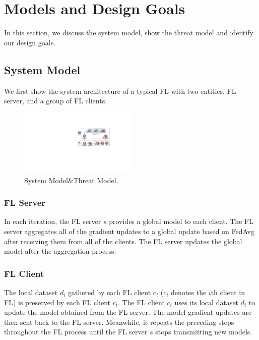 \documentclass[journal]{IEEEtran}
\begin{document}
\section{Models and Design Goals}

In this section, we discuss the system model, show the threat model and identify our design goals.

\subsection{System Model}We first show the system architecture of a typical FL with two entities, FL server, and a group of FL clients.
  \begin{figure}
    \centering
  \includegraphics[width=0.5\textwidth]{figures/Figure_System.pdf}
  \caption{System Model\&Threat Model.}
  \label{fig_system}
  \end{figure}   
\subsubsection{{FL Server}} In each iteration, the FL server $s$ provides a global model to each client. The FL server aggregates all of the gradient updates to a global update based on FedAvg after receiving them from all of the clients. The FL server updates the global model after the aggregation process.

\subsubsection{{FL Client}} The local dataset $d_i$ gathered by each FL client $c_i$ ($c_i$ denotes the $i$th client in FL) is preserved by each FL client $c_i$. The FL client $c_i$ uses its local dataset $d_i$ to update the model obtained from the FL server. The model gradient updates are then sent back to the FL server. Meanwhile, it repeats the preceding steps throughout the FL process until the FL server $s$ stops transmitting new models.
\end{document}
